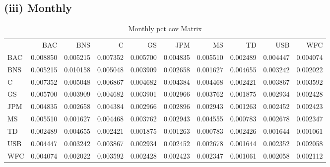 \documentclass{article}
\begin{document}
\subsection*{(iii) Monthly}
\begin{table}
\caption{Monthly pct cov Matrix}
\label{tab:monthly_pct_cov}
\begin{tabular}{lrrrrrrrrr}
 & BAC & BNS & C & GS & JPM & MS & TD & USB & WFC \\
BAC & 0.008850 & 0.005215 & 0.007352 & 0.005700 & 0.004835 & 0.005510 & 0.002489 & 0.004447 & 0.004074 \\
BNS & 0.005215 & 0.010158 & 0.005048 & 0.003909 & 0.002658 & 0.001627 & 0.004655 & 0.003242 & 0.002022 \\
C & 0.007352 & 0.005048 & 0.006867 & 0.004682 & 0.004384 & 0.004468 & 0.002421 & 0.003867 & 0.003592 \\
GS & 0.005700 & 0.003909 & 0.004682 & 0.003901 & 0.002966 & 0.003762 & 0.001875 & 0.002934 & 0.002428 \\
JPM & 0.004835 & 0.002658 & 0.004384 & 0.002966 & 0.002896 & 0.002943 & 0.001263 & 0.002452 & 0.002423 \\
MS & 0.005510 & 0.001627 & 0.004468 & 0.003762 & 0.002943 & 0.004555 & 0.000783 & 0.002678 & 0.002347 \\
TD & 0.002489 & 0.004655 & 0.002421 & 0.001875 & 0.001263 & 0.000783 & 0.002426 & 0.001644 & 0.001061 \\
USB & 0.004447 & 0.003242 & 0.003867 & 0.002934 & 0.002452 & 0.002678 & 0.001644 & 0.002352 & 0.002058 \\
WFC & 0.004074 & 0.002022 & 0.003592 & 0.002428 & 0.002423 & 0.002347 & 0.001061 & 0.002058 & 0.002112 \\
\end{tabular}
\end{table}
\end{document}
